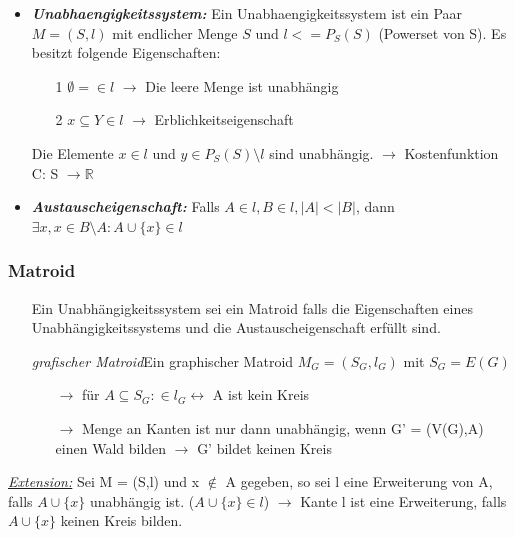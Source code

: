 \begin{itemize}
	\item \textbf{\textit{Unabhaengigkeitssystem:}} \newline Ein Unabhaengigkeitssystem ist ein Paar $M = (S,l)$ mit endlicher Menge $S$ und $l <= P_S(S)$ (Powerset von S). Es besitzt folgende Eigenschaften:
	\begin{itemize}
		\item[1] $\emptyset = {} \in l$ $\rightarrow$ Die leere Menge ist unabhängig
		\item[2] $x \subseteq Y \in l$ $\rightarrow$ Erblichkeitseigenschaft
	\end{itemize}
	Die Elemente $x \in l$ und $y \in P_S(S) \setminus l$ sind unabhängig. \newline
	$\rightarrow$ Kostenfunktion C: S $\rightarrow \mathbb{R}$ 
	\item \textbf{\textit{Austauscheigenschaft:}} \newline Falls $A \in l, B \in l, |A| < |B|$, dann $\exists x, x \in B \setminus A: A \cup \{x\} \in l$
\end{itemize}

\subsubsection{Matroid}
\begin{itemize}
	\item[] Ein Unabhängigkeitssystem sei ein Matroid falls die Eigenschaften eines Unabhängigkeitssystems und die Austauscheigenschaft erfüllt sind.
	\item[] \textit{grafischer Matroid}\newline Ein graphischer Matroid $M_G = (S_G,l_G)$ mit $S_G = E(G)$
	\begin{itemize}
		\item[$\rightarrow$] für $A \subseteq S_G: \in l_G \leftrightarrow$ A ist kein Kreis
		\item[$\rightarrow$] Menge an Kanten ist nur dann unabhängig, wenn G' = (V(G),A) einen Wald bilden $\rightarrow$ G' bildet keinen Kreis
	\end{itemize}
\end{itemize}

\underline{\textit{Extension:}} \newline Sei M = (S,l) und x $\notin$ A gegeben, so sei l eine Erweiterung von A, falls $A \cup \{x\}$ unabhängig ist. ($A \cup \{x\}\in l$) \newline  $\rightarrow$ Kante l ist eine Erweiterung, falls $A \cup \{x\}$ keinen Kreis bilden. \newline 

